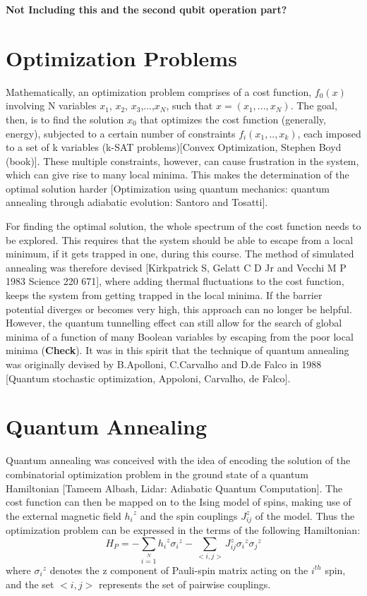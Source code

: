 \documentclass[12]{article}
\begin{document}
\textbf{Not Including this and the second qubit operation part?}
\section{Optimization Problems}
Mathematically, an optimization problem comprises of a cost function, $f_0(x)$ involving N variables $x_1$, $x_2$, $x_3$,...,$x_N$, such that $x=(x_1,...,x_N)$. The goal, then, is to find the solution $x_0$ that optimizes the cost function (generally, energy), subjected to a certain number of constraints $f_i(x_1,..,x_k)$, each imposed to a set of k variables (k-SAT problems)[Convex Optimization, Stephen Boyd (book)]. These multiple constraints, however, can cause frustration in the system, which can give rise to many local minima. This makes the determination of the optimal solution harder [Optimization using quantum mechanics: quantum annealing through adiabatic evolution: Santoro and Tosatti].

For finding the optimal solution, the whole spectrum of the cost function needs to be explored. This requires that the system should be able to escape from a local minimum, if it gets trapped in one, during this course. The method of simulated annealing was therefore devised [Kirkpatrick S, Gelatt C D Jr and Vecchi M P 1983 Science 220 671], where adding thermal fluctuations to the cost function, keeps the system from getting trapped in the local minima. If the barrier potential diverges or becomes very high, this approach can no longer be helpful. However, the quantum tunnelling effect can still allow for the search of global minima of a function of many Boolean variables by escaping from the poor local minima (\textbf{Check}). It was in this spirit that the technique of quantum annealing was originally devised by B.Apolloni, C.Carvalho and D.de Falco in 1988 [Quantum stochastic optimization, Appoloni, Carvalho, de Falco].
\section{Quantum Annealing}
Quantum annealing was conceived with the idea of encoding the solution of the combinatorial optimization problem in the ground state of a quantum Hamiltonian [Tameem Albash, Lidar: Adiabatic Quantum Computation]. 
The cost function can then be mapped on to the Ising model of spins, making use of the external magnetic field ${h_i}^z$ and the spin couplings ${J_{ij}^z}$ of the model. Thus the optimization problem can be expressed in the terms of the following Hamiltonian:
\begin{equation}
H_P=-\sum\limits_{i=1}\limits^{N}{h_i}^z{\sigma_i}^z - \sum\limits_{<i,j>}{J_{ij}^z} {\sigma_i}^z{\sigma_j}^z \label{eq:b4}
\end{equation}
where ${\sigma_i}^z$ denotes the z component of Pauli-spin matrix acting on the $i^{th}$ spin, and the set $<i,j>$ represents the set of pairwise couplings.
\end{document}
